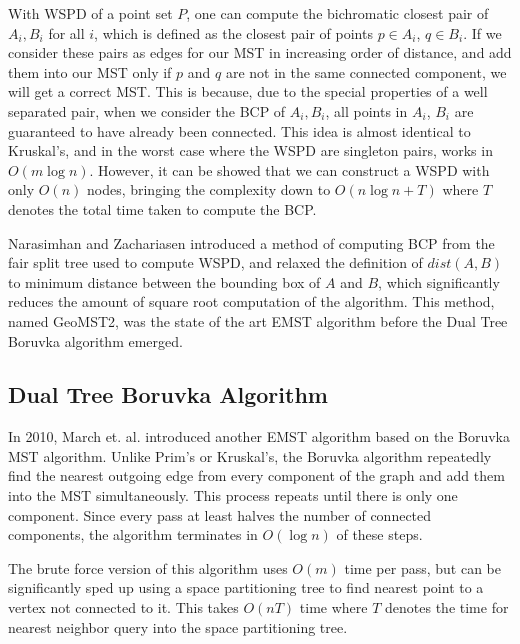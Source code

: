 \documentclass[11pt]{article}
\begin{document}
With WSPD of a point set $P$, one can compute the bichromatic closest pair of $A_i, B_i$ for all $i$, which is defined as the closest pair of points $p \in A_i$, $q \in B_i$. If we consider these pairs as edges for our MST in increasing order of distance, and add them into our MST only if $p$ and $q$ are not in the same connected component, we will get a correct MST. This is because, due to the special properties of a well separated pair, when we consider the BCP of $A_i, B_i$, all points in $A_i$, $B_i$ are guaranteed to have already been connected. This idea is almost identical to Kruskal's, and in the worst case where the WSPD are singleton pairs, works in $O(m\log{n})$. However, it can be showed that we can construct a WSPD with only $O(n)$ nodes, bringing the complexity down to $O(n\log{n} + T)$ where $T$ denotes the total time taken to compute the BCP.

Narasimhan and Zachariasen introduced a method of computing BCP from the fair split tree used to compute WSPD, and relaxed the definition of $dist(A,B)$ to minimum distance between the bounding box of $A$ and $B$, which significantly reduces the amount of square root computation of the algorithm. This method, named GeoMST2, was the state of the art EMST algorithm before the Dual Tree Boruvka algorithm emerged.\cite{Narasihman}

\subsection{Dual Tree Boruvka Algorithm}

In 2010, March et. al. introduced another EMST algorithm based on the Boruvka MST algorithm. Unlike Prim's or Kruskal's, the Boruvka algorithm repeatedly find the nearest outgoing edge from every component of the graph and add them into the MST simultaneously.\cite{Dual} This process repeats until there is only one component. Since every pass at least halves the number of connected components, the algorithm terminates in $O(\log{n})$ of these steps.

The brute force version of this algorithm uses $O(m)$ time per pass, but can be significantly sped up using a space partitioning tree to find nearest point to a vertex not connected to it. This takes $O(nT)$ time where $T$ denotes the time for nearest neighbor query into the space partitioning tree. 
\end{document}
